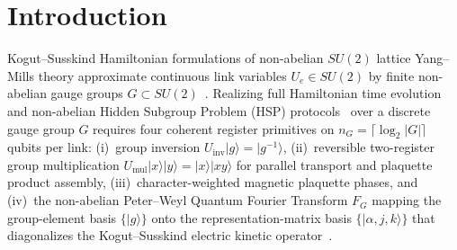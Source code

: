 \documentclass[aps,prx,twocolumn,superscriptaddress,nofootinbib]{revtex4-2}
\begin{document}
\begin{abstract}
$\btmGroupOrder$ translations to $\btmLeftOffBlockErr$), verifying exact non-abelian Hidden Subgroup coset sampling across all $\btmNumSubgroups$ canonical subgroups---including $|g Q_8\rangle \mapsto (\tfrac{1}{3},\tfrac{1}{3},\tfrac{1}{3})$ on one-dimensional irreps with $\btmQeightMaxForbLeak$ forbidden leakage---and compiling to $\btmQftAtaCz$ \texttt{CZ} (all-to-all), $\btmQftTfCz$ \texttt{CZ} (\texttt{T5}), and $\btmQftTkZz$ \texttt{ZZPhase} (\texttt{pytket} \texttt{H2}). Contextualized against Milestone~1 hardware measurements on \btmMoneBackend\ (job \btmMoneJobId, where $\btmMoneFezStructCz$ \texttt{CZ} achieved $\btmMonePValidStruct$ raw accuracy whereas $\btmMoneFezGenCz$ \texttt{CZ} decayed to $\btmMonePValidGen$), these gate budgets establish that coherent $\btmRegQubits$-qubit $2T$ Fourier sampling ($\btmQftTkZz$ \texttt{ZZPhase}) and $\btmMulQubits$-qubit $2T$ multiplication ($\btmMulAtaStructCz$ entangling gates) target all-to-all QCCD trapped-ion and fault-tolerant architectures rather than unmitigated heavy-hex NISQ devices.
\end{abstract}

\maketitle

\section{Introduction}
Kogut--Susskind Hamiltonian formulations of non-abelian $SU(2)$ lattice Yang--Mills theory approximate continuous link variables $U_e \in SU(2)$ by finite non-abelian gauge groups $G \subset SU(2)$~\cite{LammLawrenceYamauchi2019,BenderZoharCirac2018}. Realizing full Hamiltonian time evolution and non-abelian Hidden Subgroup Problem (HSP) protocols~\cite{MooreRockmoreRussell2006,EttingerHoyerKnill2004} over a discrete gauge group $G$ requires four coherent register primitives on $n_G = \lceil \log_2 |G| \rceil$ qubits per link: (i)~group inversion $U_{\mathrm{inv}}|g\rangle = |g^{-1}\rangle$, (ii)~reversible two-register group multiplication $U_{\mathrm{mul}}|x\rangle|y\rangle = |x\rangle|xy\rangle$ for parallel transport and plaquette product assembly, (iii)~character-weighted magnetic plaquette phases, and (iv)~the non-abelian Peter--Weyl Quantum Fourier Transform $F_G$ mapping the group-element basis $\{|g\rangle\}$ onto the representation-matrix basis $\{|\alpha, j, k\rangle\}$ that diagonalizes the Kogut--Susskind electric kinetic operator~\cite{LammLawrenceYamauchi2019,MochxonKitaevPreskill2004}.
\end{document}
